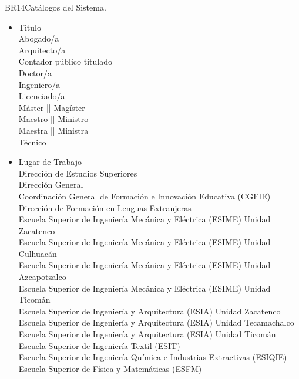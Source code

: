 \begin{BussinesRule}{BR14}{Catálogos del Sistema.}
\begin{itemize}
            Director de Educación Superiores\\
            Directora de Educación Superiores
        \item Titulo\\
            Abogado/a\\
            Arquitecto/a\\
            Contador público titulado\\
            Doctor/a\\
            Ingeniero/a\\
            Licenciado/a\\
            Máster || Magíster\\
            Maestro || Ministro\\
            Maestra || Ministra\\
            Técnico
        \item Lugar de Trabajo\\
            Dirección de Estudios Superiores\\
            Dirección General\\
            Coordinación General de Formación e Innovación Educativa (CGFIE)\\
            Dirección de Formación en Lenguas Extranjeras\\
            Escuela Superior de Ingeniería Mecánica y Eléctrica (ESIME) Unidad Zacatenco \\
            Escuela Superior de Ingeniería Mecánica y Eléctrica (ESIME) Unidad Culhuacán \\
            Escuela Superior de Ingeniería Mecánica y Eléctrica (ESIME) Unidad Azcapotzalco \\
            Escuela Superior de Ingeniería Mecánica y Eléctrica (ESIME) Unidad Ticomán \\
            Escuela Superior de Ingeniería y Arquitectura (ESIA) Unidad Zacatenco \\
            Escuela Superior de Ingeniería y Arquitectura (ESIA) Unidad Tecamachalco \\
            Escuela Superior de Ingeniería y Arquitectura (ESIA) Unidad Ticomán \\
            Escuela Superior de Ingeniería Textil (ESIT) \\
            Escuela Superior de Ingeniería Química e Industrias Extractivas (ESIQIE) \\
            Escuela Superior de Física y Matemáticas (ESFM) \\

\end{itemize}
\end{BussinesRule}
